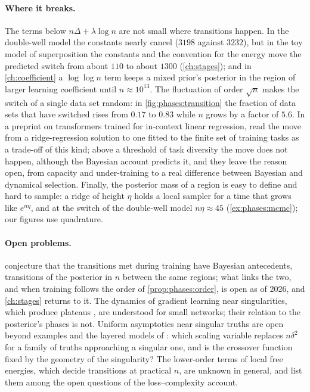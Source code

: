 \begin{refsection}
\paragraph{Where it breaks.} The terms below $n\Delta+\lambda\log n$ are not small where transitions happen. In the double-well model the constants nearly cancel ($3198$ against $3232$), but in the toy model of superposition the constants and the convention for the energy move the predicted switch from about $110$ to about $1300$ (\cref{ch:stages}); and in \cref{ch:coefficient} a $\log\log n$ term keeps a mixed prior's posterior in the region of larger learning coefficient until $n\approx10^{13}$. The fluctuation of order $\sqrt n$ makes the switch of a single data set random: in \cref{fig:phases:transition} the fraction of data sets that have switched rises from $0.17$ to $0.83$ while $n$ grows by a factor of $5.6$. In a preprint on transformers trained for in-context linear regression, \textcite{CarrollEtAl2025} read the move from a ridge-regression solution to one fitted to the finite set of training tasks as a trade-off of this kind; above a threshold of task diversity the move does not happen, although the Bayesian account predicts it, and they leave the reason open, from capacity and under-training to a real difference between Bayesian and dynamical selection. Finally, the posterior mass of a region is easy to define and hard to sample: a ridge of height $\eta$ holds a local sampler for a time that grows like $e^{n\eta}$, and at the switch of the double-well model $n\eta\approx45$ (\cref{ex:phases:mcmc}); our figures use quadrature.

\paragraph{Open problems.} \Textcite{ChenEtAl2023} conjecture that the transitions met during training have Bayesian antecedents, transitions of the posterior in $n$ between the same regions; what links the two, and when training follows the order of \cref{prop:phases:order}, is open as of 2026, and \cref{ch:stages} returns to it. The dynamics of gradient learning near singularities, which produce plateaus \parencite{FukumizuAmari2000,AmariEtAl2006,WeiEtAl2008,CousseauEtAl2008}, are understood for small networks; their relation to the posterior's phases is not. Uniform asymptotics near singular truths are open beyond examples and the layered models of \textcite{WatanabeAmari2003}: which scaling variable replaces $n\delta^2$ for a family of truths approaching a singular one, and is the crossover function fixed by the geometry of the singularity? The lower-order terms of local free energies, which decide transitions at practical $n$, are unknown in general, and \textcite{CarrollEtAl2025} list them among the open questions of the loss--complexity account.


\end{refsection}
